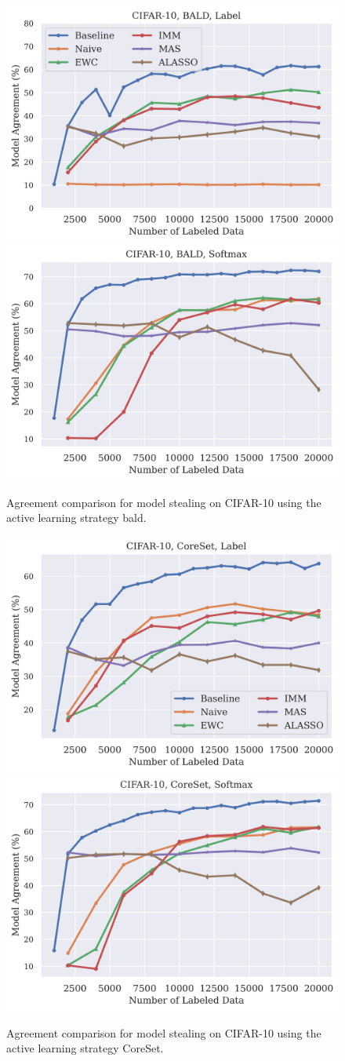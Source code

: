 \begin{figure}[!htb]
    \centering
    \includegraphics[width=0.48\linewidth]{images/results_CALMS/cifar_label_bald.png} \hfill
    \includegraphics[width=0.48\linewidth]{images/results_CALMS/cifar_softmax_bald.png}
    \caption{Agreement comparison for model stealing on CIFAR-10 using the active learning strategy \gls{bald}.}
    \label{fig:CALMSCIFAR10BALD}
\end{figure}

\begin{figure}[!htb]
    \centering
    \includegraphics[width=0.48\linewidth]{images/results_CALMS/cifar_label_coreset.png} \hfill
    \includegraphics[width=0.48\linewidth]{images/results_CALMS/cifar_softmax_coreset.png}
    \caption{Agreement comparison for model stealing on CIFAR-10 using the active learning strategy CoreSet.}
    \label{fig:CALMSCIFAR10CoreSet}
\end{figure}

